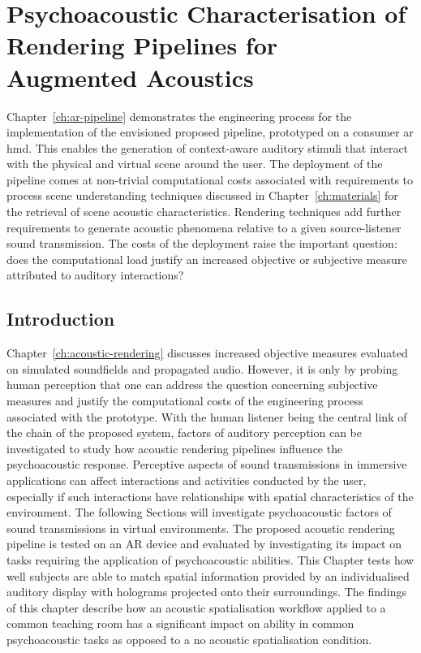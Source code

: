 \chapter{Psychoacoustic Characterisation of Rendering Pipelines for Augmented Acoustics}\label{ch:evaluation}
Chapter~\ref{ch:ar-pipeline} demonstrates the engineering process for the implementation of the envisioned proposed pipeline, prototyped on a consumer \acrshort{ar} \acrshort{hmd}. This enables the generation of context-aware auditory stimuli that interact with the physical and virtual scene around the user. The deployment of the pipeline comes at non-trivial computational costs associated with requirements to process scene understanding techniques discussed in Chapter~\ref{ch:materials} for the retrieval of scene acoustic characteristics. Rendering techniques add further requirements to generate acoustic phenomena relative to a given source-listener sound transmission. The costs of the deployment raise the important question: does the computational load justify an increased objective or subjective measure attributed to auditory interactions? \par


\section{Introduction}
Chapter~\ref{ch:acoustic-rendering} discusses increased objective measures evaluated on simulated soundfields and propagated audio. However, it is only by probing human perception that one can address the question concerning subjective measures and justify the computational costs of the engineering process associated with the prototype. With the human listener being the central link of the chain of the proposed system, factors of auditory perception can be investigated to study how acoustic rendering pipelines influence the psychoacoustic response. Perceptive aspects of sound transmissions in immersive applications can affect interactions and activities conducted by the user, especially if such interactions have relationships with spatial characteristics of the environment. The following Sections will investigate psychoacoustic factors of sound transmissions in virtual environments. The proposed acoustic rendering pipeline is tested on an AR device and evaluated by investigating its impact on tasks requiring the application of psychoacoustic abilities. This Chapter tests how well subjects are able to match spatial information provided by an individualised auditory display with holograms projected onto their surroundings. The findings of this chapter describe how an acoustic spatialisation workflow applied to a common teaching room has a significant impact on ability in common psychoacoustic tasks as opposed to a no acoustic spatialisation condition.

